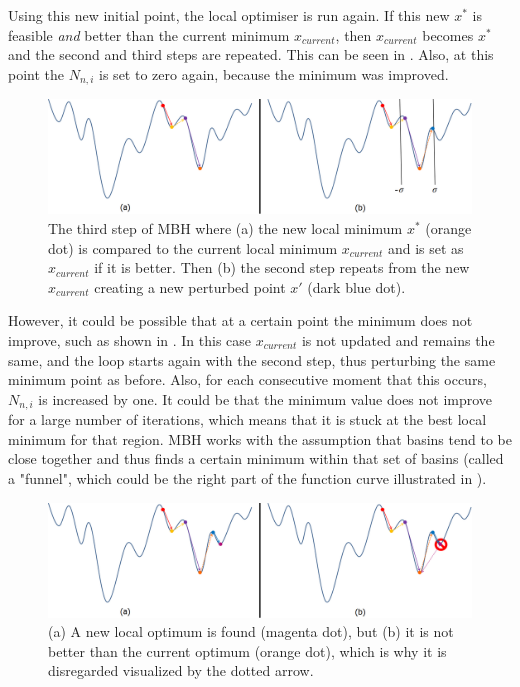 Using this new initial point, the local optimiser is run again. If this new $x^{*}$ is feasible \textit{and} better than the current minimum $x_{current}$, then $x_{current}$ becomes $x^{*}$ and the second and third steps are repeated. This can be seen in . Also, at this point the $N_{n,i}$ is set to zero again, because the minimum was improved.

\begin{figure}[!ht]
\centering
\includegraphics[width=1.0\textwidth]{figures/optimisation/mbh_explained_3.png}
\caption{The third step of \ac{MBH} where (a) the new local minimum $x^{*}$ (orange dot) is compared to the current local minimum $x_{current}$ and is set as $x_{current}$ if it is better. Then (b) the second step repeats from the new $x_{current}$ creating a new perturbed point $x'$ (dark blue dot).}
\label{fig:mbh_explained_3}
\end{figure}

However, it could be possible that at a certain point the minimum does not improve, such as shown in . In this case $x_{current}$ is not updated and remains the same, and the loop starts again with the second step, thus perturbing the same minimum point as before. Also, for each consecutive moment that this occurs, $N_{n,i}$ is increased by one. It could be that the minimum value does not improve for a large number of iterations, which means that it is stuck at the best local minimum for that region. \ac{MBH} works with the assumption that basins tend to be close together and thus finds a certain minimum within that set of basins (called a "funnel", which could be the right part of the function curve illustrated in ). 

\begin{figure}[!ht]
\centering
\includegraphics[width=1.0\textwidth]{figures/optimisation/mbh_explained_4.png}
\caption{(a) A new local optimum is found (magenta dot), but (b) it is not better than the current optimum (orange dot), which is why it is disregarded visualized by the dotted arrow.}
\label{fig:mbh_explained_4}
\end{figure}




